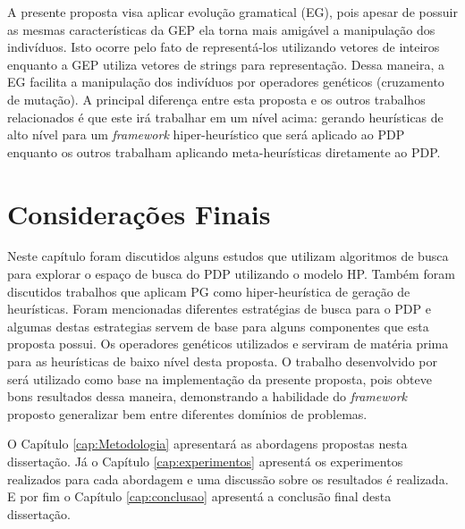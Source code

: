 A presente proposta visa aplicar evolução gramatical (EG), pois apesar de possuir as mesmas características da GEP ela torna mais amigável a manipulação dos indivíduos. Isto ocorre pelo fato de representá-los utilizando vetores de inteiros enquanto a GEP utiliza vetores de strings para representação. Dessa maneira, a EG facilita a manipulação dos indivíduos por operadores genéticos (cruzamento de mutação). A principal diferença entre esta proposta e os outros trabalhos relacionados \cite{santana2008protein,shmygelska2002ant,shmygelska2003improved,hsu2003growth, krasnogor2002multimeme,krasnogor2002multimeme,unger1993genetic} é que este irá trabalhar em um nível acima: gerando heurísticas de alto nível para um \textit{framework} hiper-heurístico que será aplicado ao PDP enquanto os outros trabalham aplicando meta-heurísticas diretamente ao PDP. 





\section{Considerações Finais}
\label{TrabalhosRelacionados:Conclusão}

Neste capítulo foram discutidos alguns estudos que utilizam algoritmos de busca para explorar o espaço de busca do PDP utilizando o modelo HP. Também foram discutidos trabalhos que aplicam PG como hiper-heurística de geração de heurísticas. Foram mencionadas diferentes estratégias de busca para o PDP e algumas destas estrategias servem de base para alguns componentes que esta proposta possui. Os operadores genéticos utilizados \cite{custodio2014multiple} e \cite{lin2011protein} serviram de matéria prima para as heurísticas de baixo nível desta proposta. O trabalho desenvolvido por \cite{sabar2015automatic} será utilizado como base na implementação da presente proposta, pois obteve bons resultados dessa maneira, demonstrando a habilidade do \textit{framework} proposto generalizar bem entre diferentes domínios de problemas.

O Capítulo \ref{cap:Metodologia} apresentará as abordagens propostas nesta dissertação. Já o Capítulo \ref{cap:experimentos} apresentá os experimentos realizados para cada abordagem e uma discussão sobre os resultados é realizada. E por fim o Capítulo \ref{cap:conclusao} apresentá a conclusão final desta dissertação.
